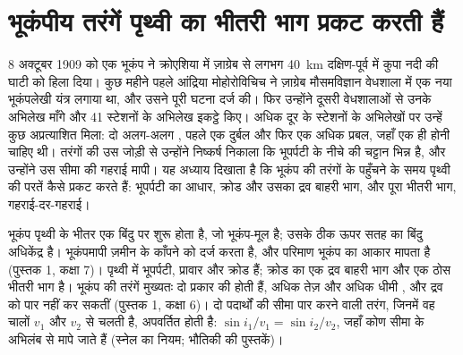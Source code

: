 \chapter{भूकंपीय तरंगें पृथ्वी का भीतरी भाग प्रकट करती हैं}\label{ch:g11:seismic-structure}

8 अक्टूबर 1909 को एक भूकंप ने क्रोएशिया में ज़ाग्रेब से लगभग \qty{40}{km} दक्षिण-पूर्व में
कुपा नदी की घाटी को हिला दिया। कुछ महीने पहले आंद्रिया
मोहोरोविचिच ने ज़ाग्रेब मौसमविज्ञान वेधशाला में एक नया भूकंपलेखी यंत्र लगाया था,
और उसने पूरी घटना दर्ज की। फिर उन्होंने दूसरी
वेधशालाओं से उनके अभिलेख माँगे और 41 स्टेशनों के अभिलेख इकट्ठे किए। अधिक दूर के
स्टेशनों के अभिलेखों पर उन्हें कुछ अप्रत्याशित मिला: दो
अलग-अलग , पहले एक दुर्बल और फिर एक अधिक प्रबल, जहाँ एक ही होनी
चाहिए थी। तरंगों की उस जोड़ी से उन्होंने निष्कर्ष निकाला कि भूपर्पटी के नीचे की चट्टान
भिन्न है, और उन्होंने उस सीमा की गहराई मापी। यह अध्याय दिखाता है कि
भूकंप की तरंगों के पहुँचने के समय पृथ्वी की परतें कैसे प्रकट करते हैं:
भूपर्पटी का आधार, क्रोड और उसका द्रव बाहरी भाग, और
पूरा भीतरी भाग, गहराई-दर-गहराई।

\begin{recall}
भूकंप पृथ्वी के भीतर एक बिंदु पर शुरू होता है, जो भूकंप-मूल है; उसके ठीक ऊपर
सतह का बिंदु अधिकेंद्र है। भूकंपमापी ज़मीन के काँपने को दर्ज करता है,
और परिमाण भूकंप का आकार मापता है (पुस्तक 1,
कक्षा 7)। पृथ्वी में भूपर्पटी, प्रावार और क्रोड हैं; क्रोड का एक द्रव
बाहरी भाग और एक ठोस भीतरी भाग है। भूकंप की तरंगें मुख्यतः दो प्रकार की होती हैं,
अधिक तेज़  और अधिक धीमी , और  द्रव को पार नहीं कर सकतीं
(पुस्तक 1, कक्षा 6)। दो पदार्थों की सीमा पार करने वाली तरंग, जिनमें
वह चालों $v_1$ और $v_2$ से चलती है, अपवर्तित होती है:
$\sin i_1/v_1 = \sin i_2/v_2$, जहाँ कोण सीमा के
अभिलंब से मापे जाते हैं (स्नेल का नियम; भौतिकी की पुस्तकें)।
\end{recall}

